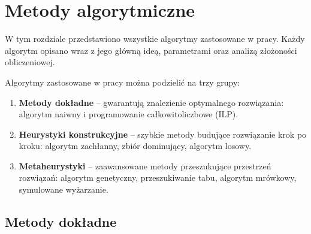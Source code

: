 \chapter{Metody algorytmiczne}\label{chap:algorithms}

W tym rozdziale przedstawiono wszystkie algorytmy zastosowane w pracy. Każdy algorytm opisano wraz z jego główną ideą, parametrami oraz analizą złożoności obliczeniowej.


Algorytmy zastosowane w pracy można podzielić na trzy grupy:
\begin{enumerate}
  \item \textbf{Metody dokładne} -- gwarantują znalezienie optymalnego rozwiązania: algorytm naiwny i programowanie całkowitoliczbowe (ILP).
  \item \textbf{Heurystyki konstrukcyjne} -- szybkie metody budujące rozwiązanie krok po kroku: algorytm zachłanny, zbiór dominujący, algorytm losowy.
  \item \textbf{Metaheurystyki} -- zaawansowane metody przeszukujące przestrzeń rozwiązań: algorytm genetyczny, przeszukiwanie tabu, algorytm mrówkowy, symulowane wyżarzanie.
\end{enumerate}





\section{Metody dokładne}

